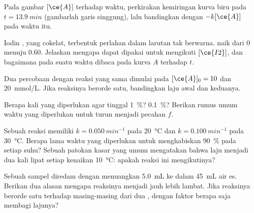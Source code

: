 \begin{exercise}[$\star\star$]\label{exo:g12:reaction-rates:9}
Pada gambar $[\ce{A}]$ terhadap waktu, perkirakan kemiringan kurva biru
pada $t = \qty{13.9}{min}$ (gambarlah garis singgung), lalu bandingkan
dengan $-k[\ce{A}]$ pada waktu itu.
\end{exercise}

\begin{exercise}[$\star\star$]\label{exo:g12:reaction-rates:10}
Iodin , yang cokelat, terbentuk perlahan dalam larutan tak
berwarna.  naik dari 0 menuju 0.60. Jelaskan mengapa
 dapat dipakai untuk mengikuti $[\ce{I2}]$, dan bagaimana  pada suatu waktu dibaca pada kurva $A$ terhadap $t$.
\end{exercise}

\begin{exercise}[$\star\star$]\label{exo:g12:reaction-rates:11}
Dua percobaan dengan reaksi yang sama dimulai pada $[\ce{A}]_0 = 10$
dan \qty{20}{mmol/L}. Jika reaksinya berorde satu, bandingkan laju awal
dan  keduanya.
\end{exercise}

\begin{exercise}[$\star\star\star$]\label{exo:g12:reaction-rates:12}
Berapa kali  yang diperlukan  agar
 tinggal \qty{1}{\percent}? \qty{0.1}{\percent}? Berikan
rumus umum waktu yang diperlukan untuk turun menjadi pecahan $f$.
\end{exercise}

\begin{exercise}[$\star\star\star$]\label{exo:g12:reaction-rates:13}
Sebuah reaksi memiliki $k = \qty{0.050}{min^{-1}}$ pada
\qty{20}{\celsius} dan $k = \qty{0.100}{min^{-1}}$ pada
\qty{30}{\celsius}. Berapa lama waktu yang diperlukan untuk menghabiskan
\qty{90}{\percent}  pada setiap suhu? Sebuah patokan kasar yang
umum mengatakan bahwa laju menjadi dua kali lipat setiap kenaikan
\qty{10}{\celsius}: apakah reaksi ini mengikutinya?
\end{exercise}

\begin{exercise}[$\star\star\star$]\label{exo:g12:reaction-rates:14}
Sebuah sampel diredam dengan menuangkan \qty{5.0}{mL} ke dalam
\qty{45}{mL} air es. Berikan dua alasan mengapa reaksinya menjadi jauh
lebih lambat. Jika reaksinya berorde satu terhadap masing-masing dari
dua , dengan faktor berapa  saja membagi lajunya?
\end{exercise}

